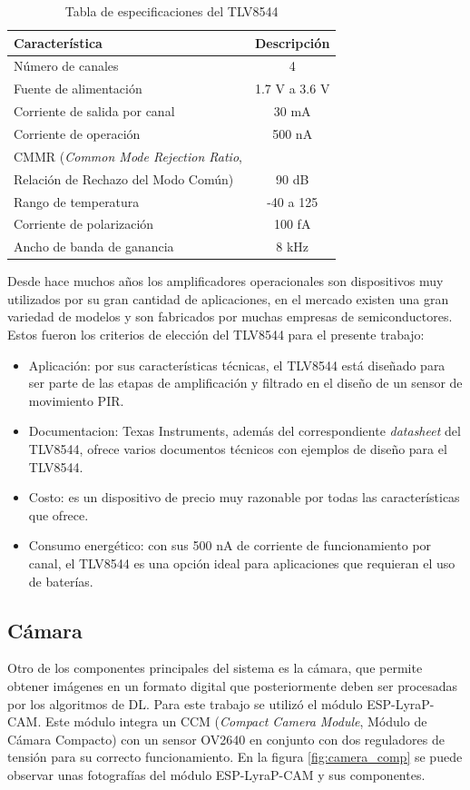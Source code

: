 \begin{table}[h]
	\centering
	\caption[TLV8544 especificaciones]{Tabla de especificaciones del TLV8544 \cite{opamp_info}}
	\begin{tabular}{lc}   
		\toprule
		\textbf{Característica} 	 & \textbf{Descripción}  \\
		\midrule
		Número de canales & 4 \\
		Fuente de alimentación & 1.7 V a 3.6 V \\
		Corriente de salida por canal & 30 mA \\
		Corriente de operación & 500 nA \\
		CMMR (\textit{Common Mode Rejection Ratio}, \\ Relación de Rechazo del Modo Común) & 90 dB \\
		Rango de temperatura & -40 \textcelsius  a 125 \textcelsius\\
		Corriente de polarización & 100 fA \\
		Ancho de banda de ganancia & 8 kHz \\
		\bottomrule
		\hline
	\end{tabular}
	\label{tab:opamp_specs}
\end{table}

Desde hace muchos años los amplificadores operacionales son dispositivos muy utilizados por su gran cantidad de aplicaciones, en el mercado existen una gran variedad de modelos y son fabricados por muchas empresas de semiconductores. Estos fueron los criterios de elección del TLV8544 para el presente trabajo:
\begin{itemize}
	\item Aplicación: por sus características técnicas, el TLV8544 está diseñado para ser parte de las etapas de amplificación y filtrado en el diseño de un sensor de movimiento PIR.
	\item Documentacion: Texas Instruments, además del correspondiente \textit{datasheet} del TLV8544, ofrece varios documentos técnicos con ejemplos de diseño para el TLV8544.
	\item Costo: es un dispositivo de precio muy razonable por todas las características que ofrece.
	\item Consumo energético: con sus 500 nA de corriente de funcionamiento por canal, el TLV8544 es una opción ideal para aplicaciones que requieran el uso de baterías.
\end{itemize}

\subsection{Cámara}
Otro de los componentes principales del sistema es la cámara, que permite obtener imágenes en un formato digital que posteriormente deben ser procesadas por los algoritmos de DL. Para este trabajo se utilizó el módulo ESP-LyraP-CAM. Este módulo integra un CCM (\textit{Compact Camera Module}, Módulo de Cámara Compacto) con un sensor OV2640 en conjunto con dos reguladores de tensión para su correcto funcionamiento. En la figura \ref{fig:camera_comp} se puede observar unas fotografías del módulo ESP-LyraP-CAM y sus componentes.

